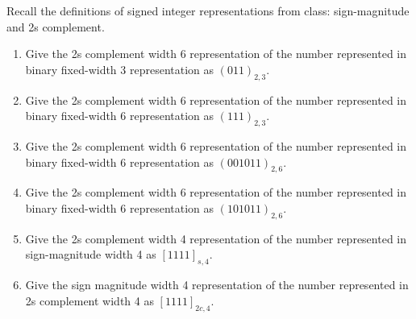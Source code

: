
Recall the definitions of signed integer representations from class: 
sign-magnitude and 2s complement.

\begin{enumerate}
    \item Give the 2s complement width 6 representation of the number 
    represented in binary fixed-width 3
    representation as $(011)_{2,3}$. 
    \item Give the 2s complement width 6 representation of the number 
    represented in binary fixed-width 6
    representation as $(111)_{2,3}$. 
    \item Give the 2s complement width 6 representation of the number 
    represented in binary fixed-width 6
    representation as $(001011)_{2,6}$. 
    \item Give the 2s complement width 6 representation of the number 
    represented in binary fixed-width 6
    representation as $(101011)_{2,6}$. 
    \item Give the 2s complement width 4 representation of the number 
    represented in sign-magnitude
    width 4 as $[1111]_{s,4}$.
    \item Give the sign magnitude width 4 representation of the number 
    represented in 2s complement
    width 4 as $[1111]_{2c,4}$.
\end{enumerate}